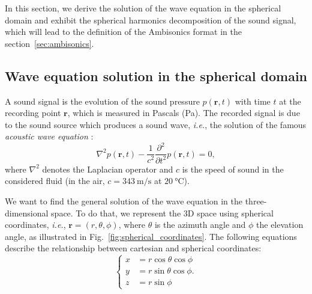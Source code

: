 In this section, we derive the solution of the wave equation in the spherical domain and exhibit the spherical harmonics decomposition of the sound signal, which will lead to the definition of the Ambisonics format in the section~\ref{sec:ambisonics}.

\subsection{Wave equation solution in the spherical domain}

A sound signal is the evolution of the sound pressure $p(\mathbf{r},t)$ with time $t$ at the recording point $\mathbf{r}$, which is measured in Pascals (Pa). The recorded signal is due to the sound source which produces a sound wave, \emph{i.e.}, the solution of the famous \textit{acoustic wave equation} :
\begin{equation}
\label{eq:waveEquation}
    \nabla^2 p(\mathbf{r},t) - \frac{1}{c^2} \frac{\partial^2}{\partial t^2} p(\mathbf{r},t) = 0,
\end{equation}
where $\nabla^2$ denotes the Laplacian operator and $c$ is the speed of sound in the considered fluid (in the air, $c = \SI{343}{\meter\per\second}$ at $\SI{20}{\degreeCelsius}$).

We want to find the general solution of the wave equation in the three-dimensional space. To do that, we represent the 3D space using spherical coordinates, \emph{i.e.}, ${\mathbf{r} = (r, \theta, \phi)}$, where $\theta$ is the azimuth angle and $\phi$ the elevation angle, as illustrated in Fig.~\ref{fig:spherical_coordinates}. The following equations describe the relationship between cartesian and spherical coordinates:
\begin{equation}
\label{eq:spherical_coordinates}
    \left\{ 
    \begin{aligned} 
      x &= r \cos\theta \cos\phi \\
      y &= r \sin\theta \cos\phi. \\
      z &= r \sin\phi
    \end{aligned}
    \right.
\end{equation}

